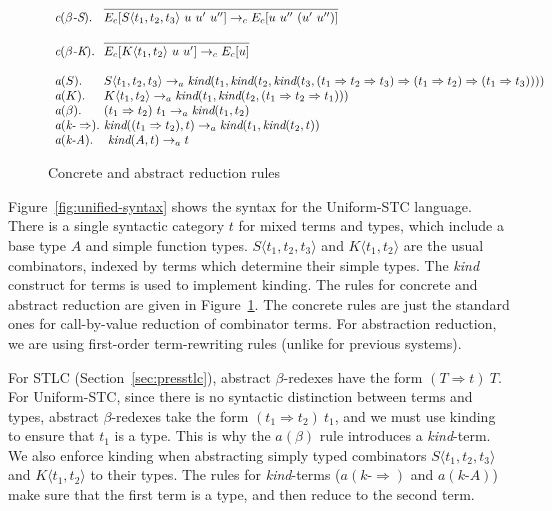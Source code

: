 \documentclass{LMCS}
\newcommand{\To}[0]{\Rightarrow}
\begin{document}
\begin{figure}[t]
\[
  \begin{array}{ll}
  \textit{c}(\beta\textit{-S}). \!\!&\!\! \infer{E_c[S\langle t_1,t_2,t_3\rangle\ u\ u'\ u''] \to_c E_c[u\ u''\ (u'\ u'')]}{\ }
\\ \\
  \textit{c}(\beta\textit{-K}). \!\!&\!\!  \infer{E_c[K\langle t_1,t_2\rangle\ u\ u'] \to_c E_c[u]}{\ }
\\ \\
  \textit{a}(S). \!\!&\!\!  S\langle t_1,t_2,t_3\rangle \to_a \textit{kind}(t_1,\textit{kind}(t_2,\textit{kind}(t_3, (t_1\To t_2 \To t_3) \To (t_1\To t_2) \To (t_1 \To t_3))))
  \\
  \textit{a}(K). \!\!&\!\!  K\langle t_1,t_2\rangle \to_a \textit{kind}(t_1,\textit{kind}(t_2,(t_1\To t_2 \To t_1)))
  \\
  \textit{a}(\beta). \!\!&\!\!  (t_1\To t_2)\ t_1 \to_a \textit{kind}(t_1,t_2)
  \\
  \textit{a}(\textit{k-}\To). \!\!&\!\!  \textit{kind}((t_1 \To t_2), t) \to_a \textit{kind}(t_1,\textit{kind}(t_2,t))
  \\
  \textit{a}(\textit{k-A}). & \textit{kind}(A,t) \to_a t
  \end{array}
\]
  \caption{Concrete and abstract reduction rules}
  \label{fig:uni-rules}
\end{figure}

Figure~\ref{fig:unified-syntax} shows the syntax for the Uniform-STC
language.  There is a single syntactic category $t$ for mixed terms
and types, which include a base type $A$ and simple function types.
$S\langle t_1,t_2,t_3\rangle$ and $K\langle t_1,t_2\rangle$ are the
usual combinators, indexed by terms which determine their simple
types.  The \textit{kind} construct for terms is used to implement
kinding.  The rules for concrete and abstract reduction are given in
Figure~\ref{fig:uni-rules}.  The concrete rules are just the standard
ones for call-by-value reduction of combinator terms.  For abstraction
reduction, we are using first-order term-rewriting rules (unlike for
previous systems).  



For STLC (Section~\ref{sec:presstlc}), abstract $\beta$-redexes have the
form $(T\To t)\ T$.  For Uniform-STC, since there is no syntactic
distinction between terms and types, abstract $\beta$-redexes take the
form $(t_1\To t_2)\ t_1$, and we must use kinding to ensure that $t_1$
is a type.  This is why the $a(\beta)$ rule introduces a
\textit{kind}-term.  We also enforce kinding when abstracting simply
typed combinators $S\langle t_1,t_2,t_3\rangle$ and $K\langle
t_1,t_2\rangle$ to their types.  The rules for \textit{kind}-terms
($a(\textit{k-}\To)$ and $a(\textit{k-A})$) make sure that the first
term is a type, and then reduce to the second term.
\end{document}
